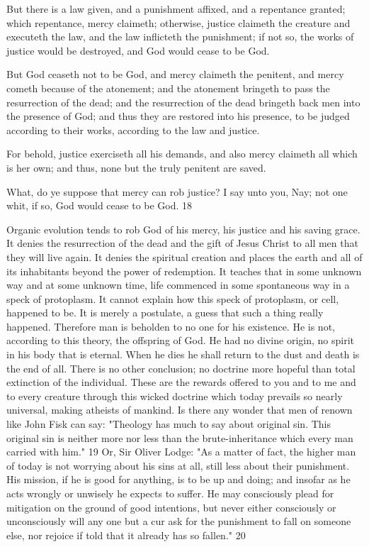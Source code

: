 But there is a law given, and a punishment affixed, and a repentance granted; which
repentance, mercy claimeth; otherwise, justice claimeth the creature and executeth the law,
and the law inflicteth the punishment; if not so, the works of justice would be destroyed, and
God would cease to be God.

But God ceaseth not to be God, and mercy claimeth the penitent, and mercy cometh because
of the atonement; and the atonement bringeth to pass the resurrection of the dead; and the
resurrection of the dead bringeth back men into the presence of God; and thus they are
restored into his presence, to be judged according to their works, according to the law and
justice.

For behold, justice exerciseth all his demands, and also mercy claimeth all which is her own;
and thus, none but the truly penitent are saved.

What, do ye suppose that mercy can rob justice? I say unto you, Nay; not one whit, if so, God
would cease to be God. 18

Organic evolution tends to rob God of his mercy, his justice and his saving grace. It denies
the resurrection of the dead and the gift of Jesus Christ to all men that they will live again. It
denies the spiritual creation and places the earth and all of its inhabitants beyond the power
of redemption. It teaches that in some unknown way and at some unknown time, life
commenced in some spontaneous way in a speck of protoplasm. It cannot explain how this
speck of protoplasm, or cell, happened to be. It is merely a postulate, a guess that such a
thing really happened. Therefore man is beholden to no one for his existence. He is not,
according to this theory, the offspring of God. He had no divine origin, no spirit in his body
that is eternal. When he dies he shall return to the dust and death is the end of all. There is no
other conclusion; no doctrine more hopeful than total extinction of the individual. These are
the rewards offered to you and to me and to every creature through this wicked doctrine
which today prevails so nearly universal, making atheists of mankind. Is there any wonder
that men of renown like John Fisk can say: "Theology has much to say about original sin.
This original sin is neither more nor less than the brute-inheritance which every man carried
with him." 19 Or, Sir Oliver Lodge: "As a matter of fact, the higher man of today is not
worrying about his sins at all, still less about their punishment. His mission, if he is good for
anything, is to be up and doing; and insofar as he acts wrongly or unwisely he expects to
suffer. He may consciously plead for mitigation on the ground of good intentions, but never
either consciously or unconsciously will any one but a cur ask for the punishment to fall on
someone else, nor rejoice if told that it already has so fallen." 20

